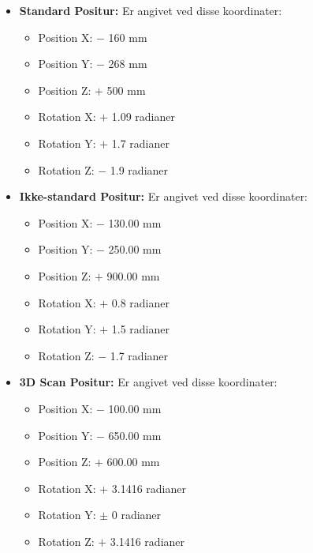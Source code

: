\begin{itemize}
\item \textbf{Standard Positur:} Er angivet ved disse koordinater:
\begin{itemize}
\item Position X: $-$ 160 mm
\item Position Y: $-$ 268 mm
\item Position Z: $+$ 500 mm
\item Rotation X: $+$ 1.09 radianer
\item Rotation Y: $+$ 1.7 radianer
\item Rotation Z: $-$ 1.9 radianer
\end{itemize}

\item \textbf{Ikke-standard Positur:} Er angivet ved disse koordinater:
\begin{itemize}
\item Position X: $-$ 130.00 mm
\item Position Y: $-$ 250.00 mm
\item Position Z: $+$ 900.00 mm
\item Rotation X: $+$ 0.8 radianer
\item Rotation Y: $+$ 1.5 radianer
\item Rotation Z: $-$ 1.7 radianer
\end{itemize}

\item \textbf{3D Scan Positur:} Er angivet ved disse koordinater:
\begin{itemize}
\item Position X: $-$ 100.00 mm
\item Position Y: $-$ 650.00 mm
\item Position Z: $+$ 600.00 mm
\item Rotation X: $+$ 3.1416 radianer
\item Rotation Y: $\pm$ 0 radianer
\item Rotation Z: $+$ 3.1416 radianer
\end{itemize}
\end{itemize}

